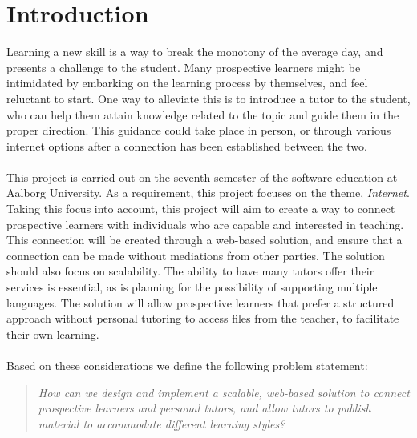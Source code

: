\chapter{Introduction}
Learning a new skill is a way to break the monotony of the average day, and presents a challenge to the student.
Many prospective learners might be intimidated by embarking on the learning process by themselves, and feel reluctant to start.
One way to alleviate this is to introduce a tutor to the student, who can help them attain knowledge related to the topic and guide them in the proper direction.
This guidance could take place in person, or through various internet options after a connection has been established between the two.
\\\\
This project is carried out on the seventh semester of the software education at Aalborg University. 
As a requirement, this project focuses on the theme, \textit{Internet}.
Taking this focus into account, this project will aim to create a way to connect prospective learners with individuals who are capable and interested in teaching.
This connection will be created through a web-based solution, and ensure that a connection can be made without mediations from other parties.
The solution should also focus on scalability. 
The ability to have many tutors offer their services is essential, as is planning for the possibility of supporting multiple languages. 
The solution will allow prospective learners that prefer a structured approach without personal tutoring to access files from the teacher, to facilitate their own learning.
\\\\
Based on these considerations we define the following problem statement:
\begin{quote}
    \textit{How can we design and implement a scalable, web-based solution to connect prospective learners and personal tutors, and allow tutors to publish material to accommodate different learning styles?}
\end{quote}
